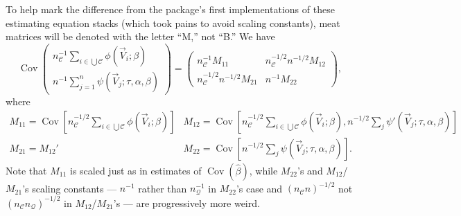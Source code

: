 \documentclass{article}
\begin{document}
To help mark the difference from the package's first implementations of these estimating equation stacks (which took pains to avoid scaling constants),
meat matrices will be denoted with the letter ``M,'' not ``B.''
We have
\[
\operatorname{Cov}\left(
     \begin{array}{c}
       n_{\mathcal{C}}^{-1}\sum_{i\in \bigcup \mathcal{C}}\phi(\vec{V}_{i}; \beta )\\
       n^{-1}\sum_{j=1}^{n}\psi(\vec{V}_{j}; \tau, \alpha, \beta )
     \end{array}
\right) = \left(
  \begin{array}{cc}
    n_{\mathcal{C}}^{-1}M_{11}& n_{\mathcal{C}}^{-1/2}n^{-1/2} M_{12}\\
    n_{\mathcal{C}}^{-1/2}n^{-1/2} M_{21} & n^{-1}M_{22}
  \end{array}
\right),
\]
where
\[
  \begin{array}{cc}
    M_{11}  = \operatorname{Cov}[n_{\mathcal{C}}^{-1/2}\sum_{i\in \bigcup
             \mathcal{C}} \phi(\vec{V}_{i}; \beta )] &
                                                                  M_{12}=
                                                                  \operatorname{Cov}[n_{\mathcal{C}}^{-1/2}\sum_{i\in \bigcup
             \mathcal{C}}\phi(\vec{V}_{i};
                                                                  \beta
                                                                  ), n^{-1/2}\sum_{j}\psi'(\vec{V}_{j}; \tau, \alpha, \beta )]\\
    M_{21}=M_{12}' & M_{22} = \operatorname{Cov}[n^{-1/2}\sum_{j}\psi(\vec{V}_{j};
                     \tau, \alpha, \beta )] .
    \end{array}
\]
Note that $M_{11}$ is scaled just as in estimates of $\operatorname{Cov}(\hat\beta)$, while $M_{22}$'s and
$M_{12}$/$M_{21}$'s scaling constants --- $n^{-1}$ rather than
$n_{\mathcal{Q}}^{-1}$ in $M_{22}$'s
case and $(n_{\mathcal{C}}n)^{-1/2}$ not $(n_{\mathcal{C}} n_{\mathcal{Q}})^{-1/2}$ in $M_{12}$/$M_{21}$'s --- are progressively more weird.
\end{document}
